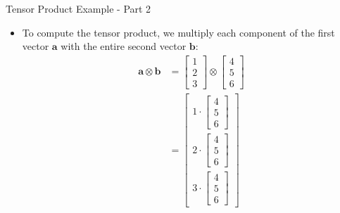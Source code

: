 \documentclass{beamer}
\begin{document}
\begin{frame}{Tensor Product Example - Part 2}
\begin{itemize}
\item To compute the tensor product, we multiply each component of the first vector $\mathbf{a}$ with the entire second vector $\mathbf{b}$:
\begin{align*}
\mathbf{a} \otimes \mathbf{b} &= \begin{bmatrix} 1 \\ 2 \\ 3 \end{bmatrix} \otimes \begin{bmatrix} 4 \\ 5 \\ 6 \end{bmatrix} \\
&= \begin{bmatrix} 1 \cdot \begin{bmatrix} 4 \\ 5 \\ 6 \end{bmatrix} \\ 2 \cdot \begin{bmatrix} 4 \\ 5 \\ 6 \end{bmatrix} \\ 3 \cdot \begin{bmatrix} 4 \\ 5 \\ 6 \end{bmatrix} \end{bmatrix} 
\end{align*}
\end{itemize}
\end{frame}
\end{document}
